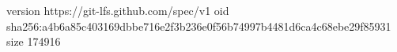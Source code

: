 version https://git-lfs.github.com/spec/v1
oid sha256:a4b6a85c403169dbbe716e2f3b236e0f56b74997b4481d6ca4c68ebe29f85931
size 174916
